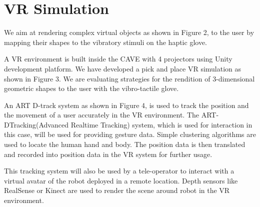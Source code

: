 \section{VR Simulation}
We aim at rendering complex virtual objects as shown in Figure 2, to
the user by mapping their shapes to the vibratory stimuli on the
haptic glove.

A VR environment is built inside the CAVE with 4 projectors using
Unity development platform. We have developed a pick and place VR
simulation as shown in Figure 3. We are evaluating strategies for the
rendition of 3-dimensional geometric shapes to the user with the
vibro-tactile glove.

An ART D-track system as shown in Figure 4, is used to track the position and the movement of a user accurately in the VR environment. The ART-DTracking(Advanced Realtime Tracking) system, which is used for interaction in this case, will be used for providing gesture data. Simple clustering algorithms are used to locate the human hand and body. The position data is then translated and recorded into position data in the VR system for further usage.


This tracking system will also be used by a tele-operator to interact
with a virtual avatar of the robot deployed in a remote
location. Depth sensors like RealSense or Kinect are used to render
the scene around robot in the VR environment.
